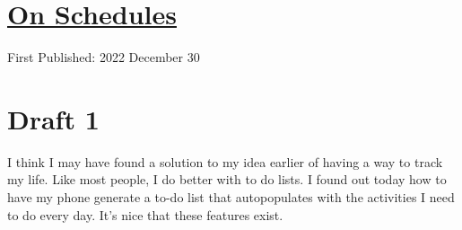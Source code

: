 \documentclass[12pt]{article}[titlepage]
\renewcommand{\,}{\textsuperscript{,}}
\begin{document}
\doublespacing
\section{\href{schedules-2.html}{On Schedules}}
First Published: 2022 December 30

\section{Draft 1}
I think I may have found a solution to my idea earlier of having a way to track my life.
Like most people, I do better with to do lists.
I found out today how to have my phone generate a to-do list that autopopulates with the activities I need to do every day.
It's nice that these features exist.
\end{document}
